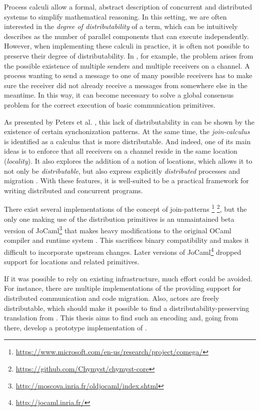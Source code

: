 Process calculi allow a formal, abstract description of concurrent
and distributed systems to simplify mathematical reasoning.
In this setting, we are often interested in the
\emph{degree of distributability} of a term,
which can be intuitively describes as the number of parallel components
that can execute independently.
However, when implementing these calculi in practice,
it is often not possible to preserve their degree of distributability.
In \picalc \cite{honda_object_1991}, for example,
the problem arises from the possible existence of multiple senders
and multiple receivers on a channel.
A process wanting to send a message to one of many possible receivers
has to make sure the receiver did not already receive a messages
from somewhere else in the meantime.
In this way, it can become necessary to solve a global consensus problem
for the correct execution of basic communication primitives.

As presented by Peters et al. \cite{peters_distributability_2013},
this lack of distributability in \asyncpicalc can be shown by the existence of
certain synchonization patterns.
At the same time, the \emph{join-calculus} \cite{fournet_reflexive_1996}
is identified as a calculus that is more distributable.
And indeed, one of its main ideas is to enforce that all receivers on a channel
reside in the same location (\emph{locality}).
It also explores the addition of a notion of locations,
which allows it to not only be \emph{distributable},
but also express explicitly \emph{distributed} processes
and migration \cite{fournet_calculus_1996}.
With these features, it is well-suited to be a practical framework for
writing distributed and concurrent programs.

There exist several implementations of the concept of join-patterns
\footnote{\url{https://www.microsoft.com/en-us/research/project/comega/}}
\footnote{\url{https://github.com/Chymyst/chymyst-core}},
but the only one making use of the distribution primitives
is an unmaintained beta version of
JoCaml\footnote{\url{http://moscova.inria.fr/oldjocaml/index.shtml}}
that makes heavy modifications to the original OCaml compiler and runtime system
\cite{conchon_jocaml:_1999}.
This sacrifices binary compatibility and makes it difficult to incorporate
upstream changes.
Later versions of JoCaml\footnote{\url{http://jocaml.inria.fr/}}
dropped support for locations and related primitives.

If it was possible to rely on existing infrastructure,
much effort could be avoided.
For instance, there are multiple implementations of the \actormodel
providing support for distributed communication and code migration.
Also, actors are freely distributable, which should make it possible
to find a distributability-preserving translation from \joincalc.
This thesis aims to find such an encoding and, going from there,
develop a prototype implementation of \distjoincalc.
